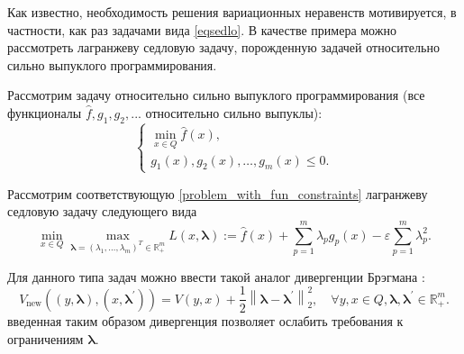     Как известно, необходимость решения вариационных неравенств мотивируется, в частности, как раз задачами вида \eqref{eqsedlo}. В качестве примера можно рассмотреть лагранжеву седловую задачу, порожденную задачей относительно сильно выпуклого программирования.  
        \begin{example} Рассмотрим задачу относительно сильно выпуклого программирования (все функционалы $\widehat{f}, g_1, g_2, ...$ относительно сильно выпуклы):
        \begin{equation}\label{problem_with_fun_constraints}
            \left\{\begin{array}{c}
            \min_{x \in Q} \widehat{f}(x), \\
            g_{1}(x), g_{2}(x), \ldots, g_{m}(x) \leq 0.
            \end{array}\right.
        \end{equation}
            
        Рассмотрим соответствующую \eqref{problem_with_fun_constraints} лагранжеву седловую задачу следующего вида
        \begin{equation}\label{lagrange_problem}
            \min_{x \in Q} \max_{ \boldsymbol{\lambda}= (\lambda_1, \ldots, \lambda_m)^T \in \mathbb{R}_+^m} L(x, \boldsymbol{\lambda}) :=  \widehat{f}(x) + \sum_{p=1}^{m} \lambda_p g_p(x) - \varepsilon \sum_{p=1}^m \lambda_{p}^2.
        \end{equation}
    \end{example}
    Для данного типа задач можно ввести такой аналог дивергенции Брэгмана \cite{Fedor_relative_adapuniv}:
    $$
        V_{\text{new}}\left((y, \boldsymbol{\lambda}), (x, \boldsymbol{\lambda}^{'})\right) = V(y,x) + \frac{1}{2} \left\|\boldsymbol{\lambda} - \boldsymbol{\lambda}^{'}\right\|_2^2, \quad  \forall y, x \in Q, \boldsymbol{\lambda},  \boldsymbol{\lambda}^{'} \in \mathbb{R}_+^m.
    $$
    введенная таким образом дивергенция позволяет ослабить требования к ограничениям $\boldsymbol{\lambda}$.

